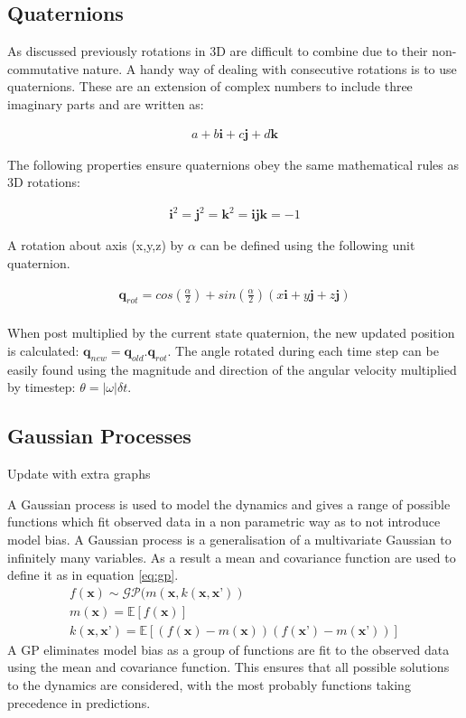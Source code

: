 \documentclass[twoside,twocolumn,12pt]{article}
\begin{document}
\subsection{Quaternions}
As discussed previously rotations in 3D are difficult to combine due to their non-commutative nature. A handy way of dealing with consecutive rotations is to use quaternions. These are an extension of complex numbers to include three imaginary parts and are written as:

\begin{align*}
a + b\textbf{i} + c\textbf{j} + d\textbf{k}
\end{align*}

The following properties ensure quaternions obey the same mathematical rules as 3D rotations:

\begin{align*}
\textbf{i}^2 = \textbf{j}^2 = \textbf{k}^2 = \textbf{ijk} = -1
\end{align*}

A rotation about axis (x,y,z) by $\alpha$ can be defined using the following unit quaternion. 

\begin{gather}
\textbf{q}_{rot} = cos(\frac{\alpha}{2}) + sin(\frac{\alpha}{2})(x\textbf{i} + y\textbf{j} + z\textbf{j}) \nonumber \\
\end{gather}

When post multiplied by the current state quaternion, the new updated position is calculated: $\textbf{q}_{new} = \textbf{q}_{old} . \textbf{q}_{rot}$.
\newline
The angle rotated during each time step can be easily found using the magnitude and direction of the angular velocity multiplied by timestep: $ \theta = |\omega |\delta t$.  \cite{arsalan}
\subsection{Gaussian Processes}
\color{red}
 Update with extra graphs
 \color{black}
 
A Gaussian process is used to model the dynamics and gives a range of possible functions which fit observed data in a non parametric way as to not introduce model bias. A Gaussian process is a generalisation of a multivariate Gaussian to infinitely many variables. As a result a mean and covariance function are used to define it as in equation \ref{eq:gp}.
\begin{equation}\label{eq:gp}
\begin{gathered}
f(\textbf{x}) \sim \mathcal{GP}(m(\textbf{x},k(\textbf{x},\textbf{x'})) \\
m(\textbf{x}) = \mathbb{E}[f(\textbf{x})]  \\
k(\textbf{x},\textbf{x'}) = \mathbb{E}[(f(\textbf{x})-m(\textbf{x}))( f(\textbf{x'})-m(\textbf{x'}))]
\end{gathered}
\end{equation}
A GP eliminates model bias as a group of functions are fit to the observed data using the mean and covariance function. This ensures that all possible solutions to the dynamics are considered, with the most probably functions taking precedence in predictions.
\end{document}
